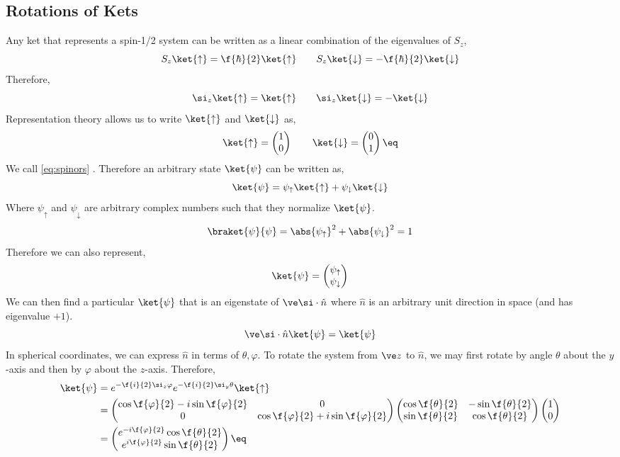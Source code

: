 \documentclass{article}
\begin{document}
\subsection{Rotations of Kets}
Any ket that represents a spin-1/2 system can be written as a linear combination of the eigenvalues of $S_z$,
\[ S_z \ket{\uparrow} = \f{\hbar}{2} \ket{\uparrow} \qquad S_z \ket{\downarrow} = -\f{\hbar}{2} \ket{\downarrow} \]
Therefore,
\[ \si_z \ket{\uparrow} =  \ket{\uparrow} \qquad \si_z \ket{\downarrow} = - \ket{\downarrow} \]
Representation theory allows us to write $\ket{\uparrow}$ and $\ket{\downarrow}$ as,
\[ \ket{\uparrow} = \begin{pmatrix}1\\0\end{pmatrix} \qquad \ket{\downarrow} = \begin{pmatrix}0\\1\end{pmatrix} \eq \label{eq:spinors} \]
We call \cref{eq:spinors} . Therefore an arbitrary state $\ket{\psi}$ can be written as,
\[ \ket{\psi} = \psi_\uparrow \ket{\uparrow} + \psi_{\downarrow} \ket{\downarrow} \]
Where $\psi_\uparrow$ and $\psi_\downarrow$ are arbitrary complex numbers such that they normalize $\ket{\psi}$.
\[ \braket{\psi}{\psi} = \abs{\psi_\uparrow}^2 + \abs{\psi_\downarrow}^2 = 1 \]
Therefore we can also represent,
\[ \ket{\psi} = \begin{pmatrix}\psi_\uparrow \\ \psi_\downarrow  \end{pmatrix} \]
We can then find a particular $\ket{\psi}$ that is an eigenstate of $\ve \si \cdot \hat n$ where $\hat n$ is an arbitrary unit direction in space (and has eigenvalue $+1$).
\[ \ve \si \cdot \hat n \ket{\psi} =  \ket{\psi} \]
In spherical coordinates, we can express $\hat n$ in terms of $\theta, \varphi$. To rotate the system from $\ve z$ to $\hat n$, we may first rotate by angle $\theta$ about the $y$-axis and then by $\varphi$ about the $z$-axis. Therefore,
\begin{align*}
    \ket{\psi}
    &= e^{-\f{i}{2} \si_z \varphi} e^{-\f{i}{2} \si_y \theta} \ket{\uparrow} \\
    &= \begin{pmatrix} \cos \f{\varphi}{2} - i \sin \f{\varphi}{2} & 0 \\ 0 & \cos \f{\varphi}{2} + i \sin \f{\varphi}{2} \end{pmatrix}\begin{pmatrix} \cos \f{\theta}{2} & -\sin \f{\theta}{2} \\ \sin \f{\theta}{2} & \cos \f{\theta}{2} \end{pmatrix} \begin{pmatrix}1\\0\end{pmatrix} \\
    &= \begin{pmatrix} e^{-i \f{\varphi}{2}}\cos \f{\theta}{2} \\ e^{i \f{\varphi}{2}}\sin \f{\theta}{2} \end{pmatrix} \eq \label{eq:directional_eigenket}
\end{align*}
\end{document}
